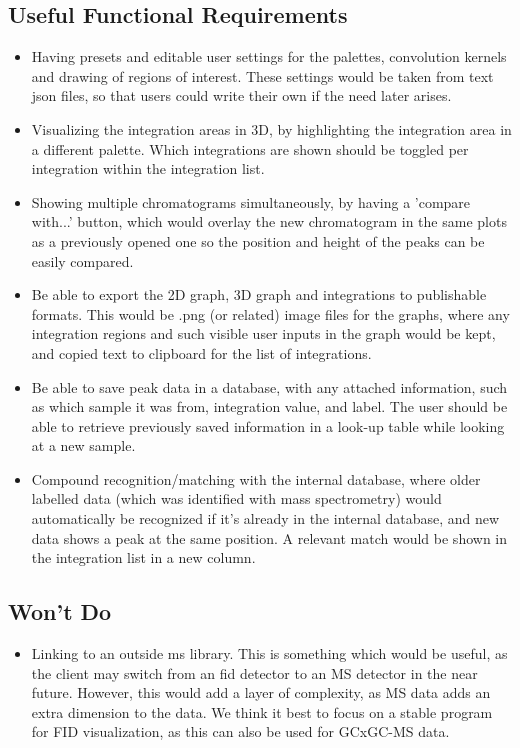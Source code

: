 \documentclass{article}
\begin{document}
\subsection*{Useful Functional Requirements}
\begin{itemize}
    \item Having presets and editable user settings for the palettes, convolution kernels and drawing of regions of interest. These settings would be taken from text json files, so that users could write their own if the need later arises.
    \item Visualizing the integration areas in 3D, by highlighting the integration area in a different palette. Which integrations are shown should be toggled per integration within the integration list.
    \item Showing multiple chromatograms simultaneously, by having a 'compare with...' button, which would overlay the new chromatogram in the same plots as a previously opened one so the position and height of the peaks can be easily compared. 
    \item Be able to export the 2D graph, 3D graph and integrations to publishable formats. This would be .png (or related) image files for the graphs, where any integration regions and such visible user inputs in the graph would be kept, and copied text to clipboard for the list of integrations.
    \item Be able to save peak data in a database, with any attached information, such as which sample it was from, integration value, and label. The user should be able to retrieve previously saved information in a look-up table while looking at a new sample.
	\item Compound recognition/matching with the internal database, where older labelled data (which was identified with mass spectrometry) would automatically be recognized if it's already in the internal database, and new data shows a peak at the same position. A relevant match would be shown in the integration list in a new column.
\end{itemize}
\subsection*{Won't Do}
\begin{itemize}
	\item Linking to an outside \acrlong{ms}  library. This is something which would be useful, as the client may switch from an \acrfull{fid} detector to an MS detector in the near future. However, this would add a layer of complexity, as MS data adds an extra dimension to the data. We think it best to focus on a stable program for FID visualization, as this can also be used for GCxGC-MS data. 
\end{itemize}
\end{document}
